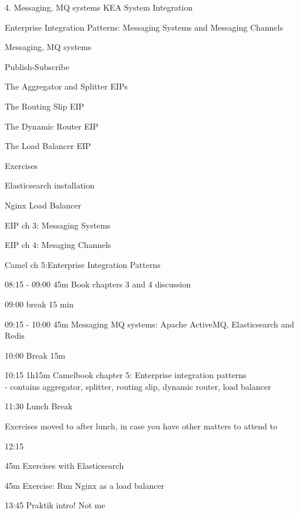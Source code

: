 \documentclass[Screen16to9,17pt]{foils}
\begin{document}
\mytitlepage
{4. Messaging, MQ systems}
{KEA System Integration}


\begin{list2}
\item Enterprise Integration Patterns: Messaging Systems and Messaging Channels
\item Messaging, MQ systems
\item Publish-Subscribe
\item The Aggregator and Splitter EIPs
\item The Routing Slip EIP
\item The Dynamic Router EIP
\item The Load Balancer EIP
\end{list2}

Exercises
\begin{list2}
\item Elasticsearch installation
\item Nginx Load Balancer
\end{list2}




\begin{list1}
\item EIP ch 3: Messaging Systems
\item EIP ch 4: Mesaging Channels
\item Camel ch 5:Enterprise Integration Patterns

\end{list1}



\begin{list2}
\item 08:15 - 09:00 45m Book chapters 3 and 4 discussion
\item 09:00 break 15 min
\item 09:15 - 10:00 45m Messaging MQ systems: Apache ActiveMQ, Elasticsearch and Redis
\item 10:00 Break 15m
\item 10:15 1h15m Camelbook chapter 5: Enterprise integration patterns\\
 - contains aggregator, splitter, routing slip, dynamic router, load balancer
\item 11:30 Lunch Break

\item Exercises moved to after lunch, in case you have other matters to attend to
\item 12:15
\item 45m Exercises with Elasticsearch
\item 45m Exercise: Run Nginx as a load balancer
\item 13:45 Praktik intro! Not me
\end{list2}
\end{document}
